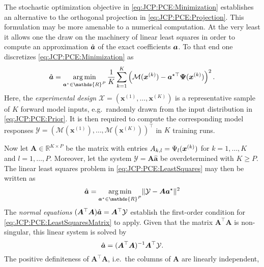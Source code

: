 The stochastic optimization objective in \cref{eq:JCP:PCE:Minimization} establishes an alternative to the orthogonal projection in \cref{eq:JCP:PCE:Projection}.
This formulation may be more amenable to a numerical computation.
At the very least it allows one the draw on the machinery of linear least squares in order to compute an approximation \(\hat{\bm{a}}\) of the exact coefficients \(\bm{a}\).
To that end one discretizes \cref{eq:JCP:PCE:Minimization} as
\begin{equation} \label{eq:JCP:PCE:LeastSquares}
  \hat{\bm{\coeffM}} = \operatorname*{arg\,min}_{\bm{\coeffM}^\star \in \mathds{R}^P}
  \frac{1}{K} \sum\limits_{k=1}^K \left( \mathcal{M}(\bm{x}^{(k)}) - \bm{\coeffM}^{\star\top} \bm{\basis}(\bm{x}^{(k)}) \right)^2.
\end{equation}
Here, the \emph{experimental design} \(\mathcal{X} = (\bm{x}^{(1)},\ldots,\bm{x}^{(K)})\) is a representative sample of \(K\) forward model inputs,
e.g.\ randomly drawn from the input distribution in \cref{eq:JCP:PCE:Prior}.
It is then required to compute the corresponding model responses \(\mathcal{Y} = (\mathcal{M}(\bm{x}^{(1)}),\ldots,\mathcal{M}(\bm{x}^{(K)}))^\top\) in \(K\) training runs.
\par %
Now let \(\bm{A} \in \mathds{R}^{K \times P}\) be the matrix with entries \(A_{k,l} = \Psi_l(\bm{x}^{(k)})\) for \(k=1,\ldots,K\) and \(l=1,\ldots,P\).
Moreover, let the system \(\mathcal{Y} = \bm{A} \hat{\bm{a}}\) be overdetermined with \(K \geq P\).
The linear least squares problem in \cref{eq:JCP:PCE:LeastSquares} may then be written as
\begin{equation} \label{eq:JCP:PCE:LeastSquaresMatrix}
  \hat{\bm{\coeffM}} = \operatorname*{arg\,min}_{\bm{\coeffM}^\star \in \mathds{R}^P} \lVert \mathcal{Y} - \bm{A} \bm{\coeffM}^{\star} \rVert^2
\end{equation}
The \emph{normal equations} \((\bm{A}^\top \bm{A}) \hat{\bm{a}} = \bm{A}^\top \mathcal{Y}\) establish the first-order condition for \cref{eq:JCP:PCE:LeastSquaresMatrix} to apply.
Given that the matrix \(\bm{A}^\top \bm{A}\) is non-singular, this linear system is solved by
\begin{equation} \label{eq:JCP:PCE:LeastSquaresSolution}
  \hat{\bm{a}} = (\bm{A}^\top \bm{A})^{-1} \bm{A}^\top \mathcal{Y}.
\end{equation}
The positive definiteness of \(\bm{A}^\top \bm{A}\), i.e.\ the columns of \(\bm{A}\) are linearly independent,

